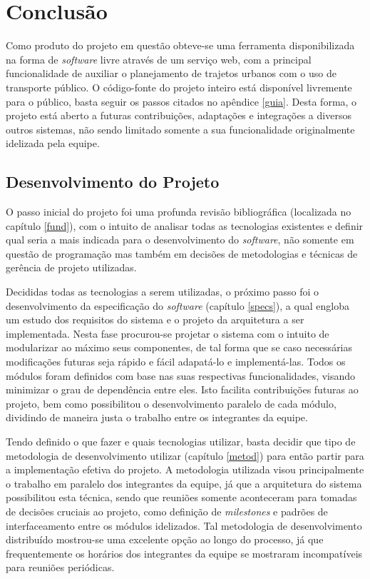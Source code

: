\chapter{Conclusão}

Como produto do projeto em questão obteve-se uma ferramenta disponibilizada na forma de \emph{software} livre através de um serviço web, com a principal funcionalidade de auxiliar o planejamento de trajetos urbanos com o uso de transporte público.
O código-fonte do projeto inteiro está disponível livremente para o público, basta seguir os passos citados no apêndice \ref{guia}.
Desta forma, o projeto está aberto a futuras contribuições, adaptações e integrações a diversos outros sistemas, não sendo limitado somente a sua funcionalidade originalmente idelizada pela equipe.

\section{Desenvolvimento do Projeto}
O passo inicial do projeto foi uma profunda revisão bibliográfica (localizada no capítulo \ref{fund}), com o intuito de analisar todas as tecnologias existentes e definir qual seria a mais indicada para o desenvolvimento do \emph{software}, não somente em questão de programação mas também em decisões de metodologias e técnicas de gerência de projeto utilizadas.

Decididas todas as tecnologias a serem utilizadas, o próximo passo foi o desenvolvimento da especificação do \emph{software} (capítulo \ref{specs}), a qual engloba um estudo dos requisitos do sistema e o projeto da arquitetura a ser implementada.
Nesta fase procurou-se projetar o sistema com o intuito de modularizar ao máximo seus componentes, de tal forma que se caso necessárias modificações futuras seja rápido e fácil adapatá-lo e implementá-las.
Todos os módulos foram definidos com base nas suas respectivas funcionalidades, visando minimizar o grau de dependência entre eles. 
Isto facilita contribuições futuras ao projeto, bem como possibilitou o desenvolvimento paralelo de cada módulo, dividindo de maneira justa o trabalho entre os integrantes da equipe.

Tendo definido o que fazer e quais tecnologias utilizar, basta decidir que tipo de metodologia de desenvolvimento utilizar (capítulo \ref{metod}) para então partir para a implementação efetiva do projeto. 
A metodologia utilizada visou principalmente o trabalho em paralelo dos integrantes da equipe, já que a arquitetura do sistema possibilitou esta técnica, sendo que reuniões somente aconteceram para tomadas de decisões cruciais ao projeto, como definição de \emph{milestones} e padrões de interfaceamento entre os módulos idelizados.
Tal metodologia de desenvolvimento distribuído mostrou-se uma excelente opção ao longo do processo, já que frequentemente os horários dos integrantes da equipe se mostraram incompatíveis para reuniões periódicas.

